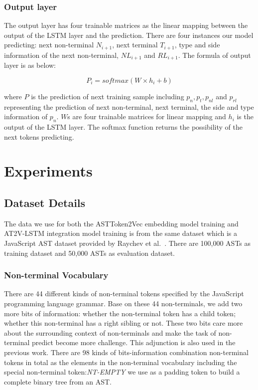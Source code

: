 \documentclass[E]{compsoft}
\begin{document}
\subsubsection{Output layer}
The output layer has four trainable matrices as the linear mapping between the output of the LSTM layer and the prediction. 
There are four instances our model predicting: 
next non-terminal $N_{i+1}$, next terminal $T_{i+1}$, type and side information of the next non-terminal, $NL_{i+1}$ and $RL_{i+1}$. 
The formula of output layer is as below:

\begin{equation}
P_{i} = softmax(W \times h_{i} + b)
\end{equation}


where $P$ is the prediction of next training sample including $p_{n}, p_{t}, p_{nl}$ and $p_{rl}$ representing the prediction of next non-terminal, next terminal, the side and type information of $p_{n}$. 
$W$s are four trainable matrices for linear mapping and $h_{i}$ is the output of the LSTM layer.
The softmax function returns the possibility of the next tokens predicting.
 




\section{Experiments}
\label{section:experiment}
\subsection{Dataset Details}
The data we use for both the ASTToken2Vec embedding model training and AT2V-LSTM integration model training is from the same dataset which is a JavaScript AST dataset provided by Raychev et al.\  \cite{dataset}. 
There are 100,000 ASTs as training dataset and 50,000 ASTs as evaluation dataset. 

\subsubsection{Non-terminal Vocabulary} 
There are 44 different kinds of non-terminal tokens specified by the JavaScript programming language grammar. 
Base on these 44 non-terminals, we add two more bits of information: whether the non-terminal token has a child token; whether this non-terminal has a right sibling or not. 
These two bits care more about the surrounding context of non-terminals and make the task of non-terminal predict become more challenge. 
This adjunction is also used in the previous work\cite{liu2016neural}\cite{dataset}. 
There are 98 kinds of bits-information combination non-terminal tokens in total as the elements in the non-terminal vocabulary including the special non-terminal token:\textit{NT-EMPTY} we use as a padding token to build a complete binary tree from an AST.
\end{document}
